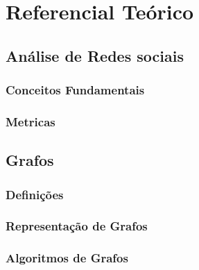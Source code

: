 \chapter{Referencial Teórico}
\label{cap:referencial_teorico}

\section{Análise de Redes sociais}


\subsection{Conceitos Fundamentais}


\subsection{Metricas}


\section{Grafos}

\subsection{Definições}

\subsection{Representação de Grafos}

\subsection{Algoritmos de Grafos}